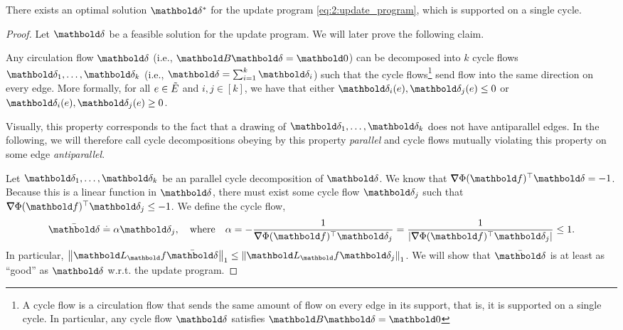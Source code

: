 \documentclass[nobib]{tufte-handout}
\newcommand{\Etil}{\Tilde{E}}
\newcommand{\vdeltabar}{\bar{\vdelta}}
\begin{document}
\begin{lem}
There exists an optimal solution $\s{\vdelta}$ for the update program \eqref{eq:2:update_program}, which is supported on a single cycle.
\end{lem}
\begin{proof}
Let $\vdelta$ be a feasible solution for the update program. We will later prove the following claim.

\begin{clm}\label{clm:2:C:3:1}
Any circulation flow $\vdelta$ (i.e., $\mB\vdelta = \vZero$) can be decomposed into $k$ cycle flows $\vdelta_1, \dots, \vdelta_k$ (i.e., $\vdelta = \sum_{i=1}^k \vdelta_i$) such that the cycle flows\footnote{A cycle flow is a circulation flow that sends the same amount of flow on every edge in its support, that is, it is supported on a single cycle. In particular, any cycle flow $\vdelta$ satisfies $\mB\vdelta = \vZero$} send flow into the same direction on every edge. More formally, for all $e \in \Etil$ and $i,j \in [k]$, we have that either $\vdelta_i(e),\vdelta_j(e) \leq 0$ or $\vdelta_i(e),\vdelta_j(e) \geq 0$.
\end{clm}

Visually, this property corresponds to the fact that a drawing of $\vdelta_1, \dots, \vdelta_k$ does not have antiparallel edges. In the following, we will therefore call cycle decompositions obeying by this property \emph{parallel} and cycle flows mutually violating this property on some edge \emph{antiparallel}.

Let $\vdelta_1, \dots, \vdelta_k$ be an parallel cycle decomposition of $\vdelta$. We know that $\trans{\grad\Phi(\vf)}\vdelta = -1$. Because this is a linear function in $\vdelta$, there must exist some cycle flow $\vdelta_j$ such that $\trans{\grad\Phi(\vf)}\vdelta_j \leq -1$. We define the cycle flow, \begin{align*}
    \vdeltabar \defeq \alpha\vdelta_j, \quad\text{where}\quad \alpha = -\frac{1}{\trans{\grad\Phi(\vf)}\vdelta_j} = \frac{1}{|\trans{\grad\Phi(\vf)}\vdelta_j|} \leq 1.
\end{align*} In particular, $\norm{\mL_\vf\vdeltabar}_1 \leq \norm{\mL_\vf\vdelta_j}_1$. We will show that $\vdeltabar$ is at least as ``good'' as $\vdelta$ w.r.t. the update program.


\end{proof}
\end{document}
